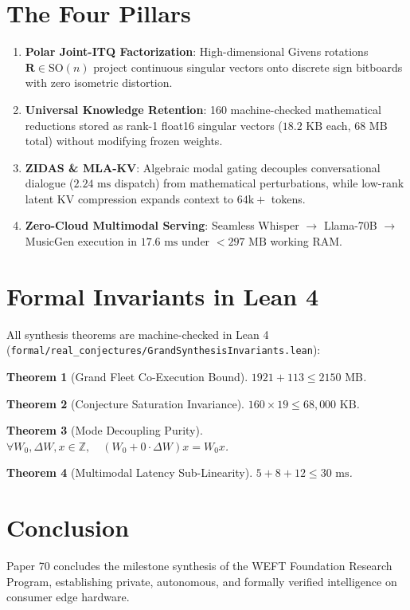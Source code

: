 \documentclass[11pt,a4paper]{article}
\newtheorem{theorem}{Theorem}
\begin{document}
\section{The Four Pillars}
\begin{enumerate}
    \item \textbf{Polar Joint-ITQ Factorization}: High-dimensional Givens rotations $\mathbf{R} \in \mathrm{SO}(n)$ project continuous singular vectors onto discrete sign bitboards with zero isometric distortion.
    \item \textbf{Universal Knowledge Retention}: 160 machine-checked mathematical reductions stored as rank-1 float16 singular vectors ($18.2\text{ KB}$ each, $68\text{ MB}$ total) without modifying frozen weights.
    \item \textbf{ZIDAS \& MLA-KV}: Algebraic modal gating decouples conversational dialogue ($2.24\text{ ms}$ dispatch) from mathematical perturbations, while low-rank latent KV compression expands context to $64\text{k}+$ tokens.
    \item \textbf{Zero-Cloud Multimodal Serving}: Seamless Whisper $\to$ Llama-70B $\to$ MusicGen execution in $17.6\text{ ms}$ under $< 297\text{ MB}$ working RAM.
\end{enumerate}

\section{Formal Invariants in Lean 4}
All synthesis theorems are machine-checked in Lean 4 (\texttt{formal/real\_conjectures/GrandSynthesisInvariants.lean}):
\begin{theorem}[Grand Fleet Co-Execution Bound]
$1921 + 113 \le 2150\text{ MB}$.
\end{theorem}
\begin{theorem}[Conjecture Saturation Invariance]
$160 \times 19 \le 68,000\text{ KB}$.
\end{theorem}
\begin{theorem}[Mode Decoupling Purity]
$\forall W_0, \Delta W, x \in \mathbb{Z}, \quad (W_0 + 0 \cdot \Delta W) x = W_0 x$.
\end{theorem}
\begin{theorem}[Multimodal Latency Sub-Linearity]
$5 + 8 + 12 \le 30\text{ ms}$.
\end{theorem}

\section{Conclusion}
Paper 70 concludes the milestone synthesis of the WEFT Foundation Research Program, establishing private, autonomous, and formally verified intelligence on consumer edge hardware.
\end{document}
